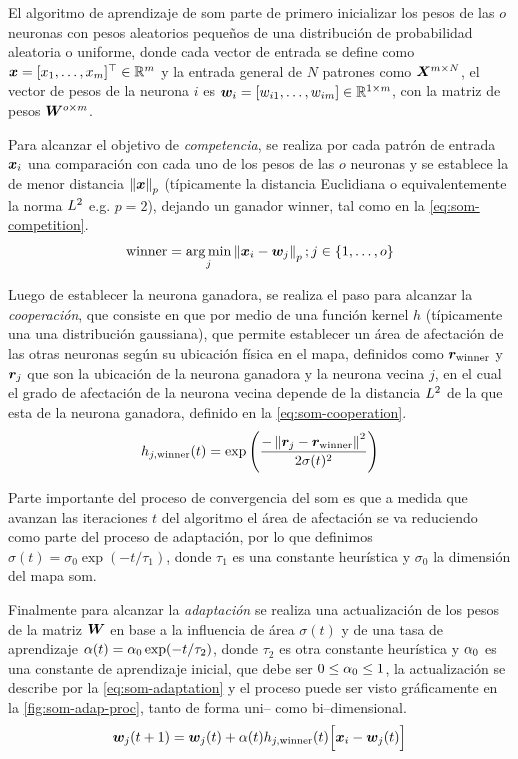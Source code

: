 El algoritmo de aprendizaje de \gls{som} parte de primero inicializar los pesos de las $o$ neuronas con pesos aleatorios pequeños de una distribución de probabilidad aleatoria o uniforme, donde cada vector de entrada se define como ${\bm{x}} = [x_1, \ldots, x_m]^{\top} \in \mathbb{R}^{m}$ y la entrada general de $N$ patrones como ${\bm{X}}^{m \times N}$, el vector de pesos de la neurona $i$ es ${\bm{w}}_i = [w_{i1}, \ldots, w_{im}] \in \mathbb{R}^{1 \times m}$, con la matriz de pesos ${\bm{W}}^{o \times m}$.

Para alcanzar el objetivo de \emph{competencia}, se realiza por cada patrón de entrada ${\bm{x}}_i$ una comparación con cada uno de los pesos de las $o$ neuronas y se establece la de menor distancia $\left\lVert{\bm{x}}\right\rVert_p$ (típicamente la distancia Euclidiana o equivalentemente la norma $L^2$ e.g. $p = 2$), dejando un ganador $\mathrm{winner}$, tal como en la \cref{eq:som-competition}.
\begin{equation} \label{eq:som-competition}
  \mathrm{winner} = \operatorname*{arg\,min}_j \left\lVert{\bm{x}}_i - {\bm{w}}_j\right\rVert_p ; j \in \{1, \ldots, o \}
\end{equation}

Luego de establecer la neurona ganadora, se realiza el paso para alcanzar la \emph{cooperación}, que consiste en que por medio de una función kernel $h$ (típicamente una una distribución gaussiana), que permite establecer un área de afectación de las otras neuronas según su ubicación física en el mapa, definidos como ${\bm{r}}_{\mathrm{winner}}$ y ${\bm{r}}_j$ que son la ubicación de la neurona ganadora y la neurona vecina $j$, en el cual el grado de afectación de la neurona vecina depende de la distancia $L^2$ de la que esta de la neurona ganadora, definido en la \cref{eq:som-cooperation}.
\begin{equation} \label{eq:som-cooperation}
  h_{j, \mathrm{winner}}(t) = \exp\Bigg(\frac{- \left\lVert{\bm{r}}_j - {\bm{r}}_{\mathrm{winner}}\right\rVert^2}{ 2 \sigma(t)^2}\Bigg)
\end{equation}

Parte importante del proceso de convergencia del \gls{som} es que a medida que avanzan las iteraciones $t$ del algoritmo el área de afectación se va reduciendo como parte del proceso de adaptación, por lo que definimos $\sigma(t) = \sigma_0 \exp(-t / \tau_1)$, donde $\tau_1$ es una constante heurística y $\sigma_0$ la dimensión del mapa \gls{som}.

Finalmente para alcanzar la \emph{adaptación} se realiza una actualización de los pesos de la matriz ${\bm{W}}$ en base a la influencia de área $\sigma(t)$ y de una tasa de aprendizaje $\alpha(t) = \alpha_0 \exp(-t/ \tau_2)$, donde $\tau_2$ es otra constante heurística y $\alpha_0$ es una constante de aprendizaje inicial, que debe ser $0 \le \alpha_0 \le 1$, la actualización se describe por la \cref{eq:som-adaptation} y el proceso puede ser visto gráficamente en la \cref{fig:som-adap-proc}, tanto de forma uni-- como bi--dimensional.
\begin{equation} \label{eq:som-adaptation}
  {\bm{w}}_j(t+1) = {\bm{w}}_j(t) + \alpha(t) h_{j, \mathrm{winner}}(t)\Big[{\bm{x}}_i-{\bm{w}}_j(t)\Big]
\end{equation}

